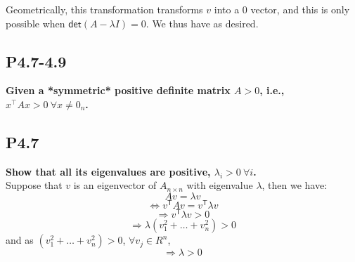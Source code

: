 \documentclass[12pt]{article}
\begin{document}
Geometrically, this transformation transforms $v$ into a $0$ vector, and this is only possible when $\textsf{det}(A-\lambda I) = 0$. We thus have as desired.


\subsection*{P4.7-4.9}
\textbf{Given a *symmetric* positive definite matrix $A>0$, i.e., $x^\top Ax > 0 ~ \forall x\neq 0_n$.}
\subsection*{P4.7}
\textbf{Show that all its eigenvalues are positive, $\lambda_i>0 ~ \forall i$.}\\
Suppose that $v$ is an eigenvector of $A_{n\times n}$ with eigenvalue $\lambda$, then we have:
$$Av = \lambda v$$
$$\Leftrightarrow v^\textsf{T}Av=v^\textsf{T}\lambda v$$
$$\Rightarrow v^\textsf{T}\lambda v > 0$$
$$\Rightarrow \lambda(v_1^2+\ldots + v_n^2)>0$$
and as $(v_1^2+\ldots + v_n^2) > 0$, $\forall v_j \in R^n$,
$$\Rightarrow\lambda >0$$
\end{document}
